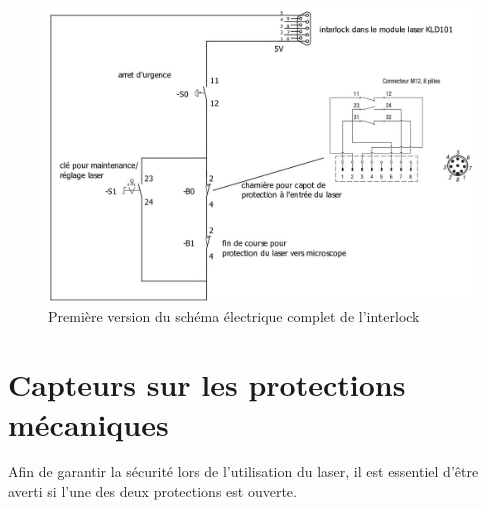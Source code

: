 \begin{figure}[H]
    \begin{center}
        \includegraphics[width=\textwidth]{assets/figures/Protections_laser/Securite_electrique/interlock_schema_elec_V1.jpeg}
    \end{center}
    \caption{Première version du schéma électrique complet de l'interlock}
    \label{schema_interlock_v1}
\end{figure}
\newpage
\section{Capteurs sur les protections mécaniques}
Afin de garantir la sécurité lors de l'utilisation du laser, il est essentiel d'être averti si l'une des deux protections est ouverte.

